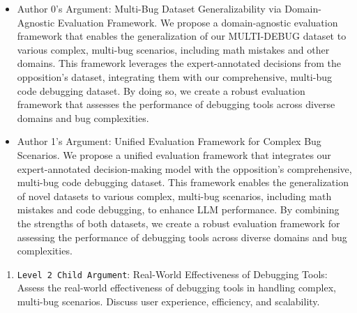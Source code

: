\begin{enumerate}
\begin{enumerate}
        \begin{itemize}
            \item Author 0's Argument: Multi-Bug Dataset Generalizability via Domain-Agnostic Evaluation Framework. We propose a domain-agnostic evaluation framework that enables the generalization of our MULTI-DEBUG dataset to various complex, multi-bug scenarios, including math mistakes and other domains. This framework leverages the expert-annotated decisions from the opposition's dataset, integrating them with our comprehensive, multi-bug code debugging dataset. By doing so, we create a robust evaluation framework that assesses the performance of debugging tools across diverse domains and bug complexities.
		\item Author 1's Argument: Unified Evaluation Framework for Complex Bug Scenarios. We propose a unified evaluation framework that integrates our expert-annotated decision-making model with the opposition's comprehensive, multi-bug code debugging dataset. This framework enables the generalization of novel datasets to various complex, multi-bug scenarios, including math mistakes and code debugging, to enhance LLM performance. By combining the strengths of both datasets, we create a robust evaluation framework for assessing the performance of debugging tools across diverse domains and bug complexities.
        \end{itemize}
    \end{enumerate}

    \begin{enumerate}
        \item \texttt{Level 2 Child Argument}: Real-World Effectiveness of Debugging Tools: Assess the real-world effectiveness of debugging tools in handling complex, multi-bug scenarios. Discuss user experience, efficiency, and scalability.


\end{enumerate}
\end{enumerate}

